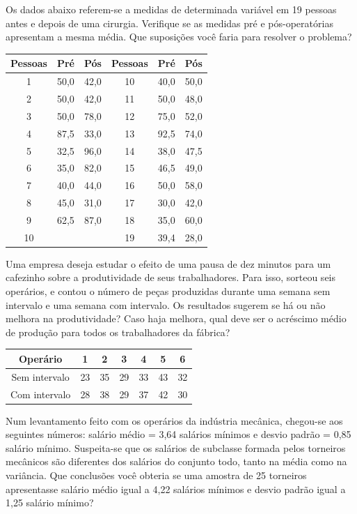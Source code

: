 \documentclass{report}
\begin{document}
\begin{Exercise}
\Question Os dados abaixo referem-se a medidas de determinada variável em 19 pessoas antes e depois de uma cirurgia. Verifique se as medidas pré e pós-operatórias 
apresentam a mesma média. Que suposições você faria para resolver o problema?

\begin{tabular}{c|c|c|c|c|c} \hline
 Pessoas & Pré & Pós & Pessoas & Pré & Pós \\ \hline
 1 & 50,0 & 42,0 & 10 & 40,0 & 50,0 \\
 2 & 50,0 & 42,0 & 11 & 50,0 & 48,0 \\
 3 & 50,0 & 78,0 & 12 & 75,0 & 52,0 \\
 4 & 87,5 & 33,0 & 13 & 92,5 & 74,0 \\
 5 & 32,5 & 96,0 & 14 & 38,0 & 47,5 \\
 6 & 35,0 & 82,0 & 15 & 46,5 & 49,0 \\
 7 & 40,0 & 44,0 & 16 & 50,0 & 58,0 \\
 8 & 45,0 & 31,0 & 17 & 30,0 & 42,0 \\
 9 & 62,5 & 87,0 & 18 & 35,0 & 60,0 \\
 10 &  &  & 19 & 39,4 & 28,0 \\ \hline
\end{tabular}

\Question Uma empresa deseja estudar o efeito de uma pausa de dez minutos para um cafezinho sobre a produtividade de seus trabalhadores. Para isso, sorteou seis operários, 
e contou o número de peças produzidas durante uma semana sem intervalo e uma semana com intervalo. Os resultados sugerem se há ou não melhora na produtividade? 
Caso haja melhora, qual deve ser o acréscimo médio de produção para todos os trabalhadores da fábrica?

\begin{tabular}{ccccccc}\hline
 Operário & 1 & 2 & 3 & 4 & 5 & 6 \\ \hline
 Sem intervalo & 23 & 35 & 29 & 33 & 43 & 32 \\
 Com intervalo & 28 & 38 & 29 & 37 & 42 & 30 \\ \hline
\end{tabular}

\Question Num levantamento feito com os operários da indústria mecânica, chegou-se aos seguintes números: salário médio = 3,64 salários mínimos e desvio padrão = 0,85 
salário mínimo. Suspeita-se que os salários de subclasse formada pelos torneiros mecânicos são diferentes dos salários do conjunto todo, tanto na média como na variância. 
Que conclusões você obteria se uma amostra de 25 torneiros apresentasse salário médio igual a 4,22 salários mínimos e desvio padrão igual a 1,25 salário mínimo?


\end{Exercise}
\end{document}
